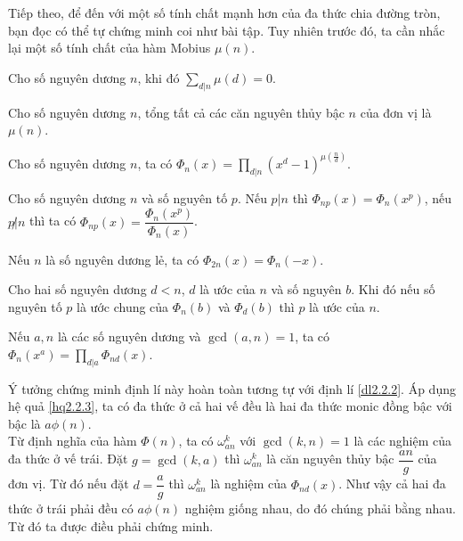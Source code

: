 Tiếp theo, để đến với một số tính chất mạnh hơn của đa thức chia đường tròn, bạn đọc có thể tự chứng minh coi như bài tập. Tuy nhiên trước đó, ta cần nhắc lại một số tính chất của hàm Mobius $\mu(n)$.
\begin{bode}
	Cho số nguyên dương $n$, khi đó $\displaystyle\sum\limits_{d|n}\mu(d)=0$.
\end{bode}
\begin{bode}\label{bode 2.2.11}
	Cho số nguyên dương $n$, tổng tất cả các căn nguyên thủy bậc $n$ của đơn vị là $\mu(n)$.
\end{bode}
\begin{dl}\label{dl2.2.12}
	Cho số nguyên dương $n$, ta có $\Phi_n(x)=\displaystyle\prod\limits_{d|n}(x^d-1)^{\mu\left(\tfrac{n}{d}\right)}$.
\end{dl}
\begin{dl}\label{dl2.2.13}
	Cho số nguyên dương $n$ và số nguyên tố $p$. Nếu $p|n$ thì $\Phi_{np}(x)=\Phi_n(x^p)$, nếu $p\not|n$ thì ta có $\Phi_{np}(x)=\dfrac{\Phi_n(x^p)}{\Phi_n(x)}$.
\end{dl}

\begin{hq}
	Nếu $n$ là số nguyên dương lẻ, ta có $\Phi_{2n}(x)=\Phi_n(-x)$.
\end{hq}

\begin{dl}\label{dl2.2.15}
	Cho hai số nguyên dương $d<n$, $d$ là ước của $n$ và số nguyên $b$. Khi đó nếu số nguyên tố $p$ là ước chung của $\Phi_n(b)$ và $\Phi_d(b)$ thì $p$ là ước của $n$.
\end{dl}

\begin{dl}\label{dl2.2.16}
	Nếu $a,n$ là các số nguyên dương và $\gcd(a,n)=1$, ta có $\Phi_n(x^a)=\displaystyle\prod\limits_{d|a}\Phi_{nd}(x)$.
\end{dl}

 Ý tưởng chứng minh định lí này hoàn toàn tương tự với định lí \eqref{dl2.2.2}. Áp dụng hệ quả \eqref{hq2.2.3}, ta có đa thức ở cả hai vế đều là hai đa thức monic đồng bậc với bậc là $a\phi(n)$.\\
Từ định nghĩa của hàm $\Phi(n)$, ta có $\omega_{an}^k$ với $\gcd(k,n)=1$ là các nghiệm của đa thức ở vế trái. Đặt $g=\gcd(k,a)$ thì $\omega_{an}^k$ là căn nguyên thủy bậc $\dfrac{an}{g}$ của đơn vị. Từ đó nếu đặt $d=\dfrac{a}{g}$ thì $\omega_{an}^k$ là nghiệm của $\Phi _{nd}(x)$. Như vậy cả hai đa thức ở trái phải đều có $a\phi(n)$ nghiệm giống nhau, do đó chúng phải bằng nhau. Từ đó ta được điều phải chứng minh.
